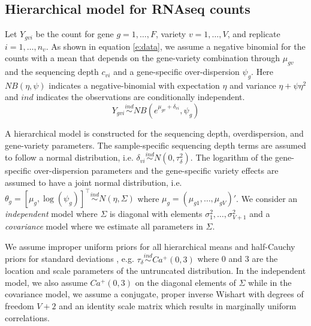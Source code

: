 \documentclass[useAMS,usenatbib,referee]{biom}
\begin{document}
\subsection{Hierarchical model for RNAseq counts}
\label{s:model}


Let $Y_{gvi}$ be the count for gene $g=1,\ldots,F$, variety $v=1,\ldots,V$, and replicate $i=1,\ldots,n_v$. As shown in equation \eqref{e:data}, we assume a negative binomial for the counts with a mean that depends on the gene-variety combination through $\mu_{gv}$ and the sequencing depth $c_{vi}$ and a gene-specific over-dispersion $\psi_g$. Here $NB(\eta,\psi)$ indicates a negative-binomial with expectation $\eta$ and variance $\eta+\psi\eta^2$ and $ind$ indicates the observations are conditionally independent.
\begin{equation} 
Y_{gvi} \stackrel{ind}{\sim} NB(e^{\mu_{gv}+\delta_{vi}},\psi_g) 
\label{e:data}
\end{equation}


A hierarchical model is constructed for the sequencing depth, overdispersion, and gene-variety parameters. The sample-specific sequencing depth terms are assumed to follow a normal distribution, i.e. $\delta_{vi} \stackrel{ind}{\sim} N(0,\tau_\delta^2)$. The logarithm of the gene-specific over-dispersion parameters and the gene-specific variety effects are assumed to have a joint normal distribution, i.e. 
$\theta_g = [\mu_g, \log(\psi_g)]^\top \stackrel{ind}{\sim} N\left(\eta, \Sigma\right)$
where $\mu_g = (\mu_{g1},\ldots,\mu_{gV})'$. We consider an \emph{independent} model where $\Sigma$ is diagonal with elements $\sigma_1^2,\ldots,\sigma_{V+1}^2$ and a \emph{covariance} model where we estimate all parameters in $\Sigma$. 



We assume improper uniform priors for all hierarchical means and half-Cauchy priors for standard deviations \citep{gelman2006prior}, e.g. $\tau_\delta\stackrel{ind}{\sim} Ca^+(0,3)$ where 0 and 3 are the location and scale parameters of the untruncated distribution. In the independent model, we also assume $Ca^+(0,3)$ on the diagonal elements of $\Sigma$ while in the covariance model, we assume a conjugate, proper inverse Wishart with degrees of freedom $V+2$ and an identity scale matrix which results in marginally uniform correlations. 
\end{document}
